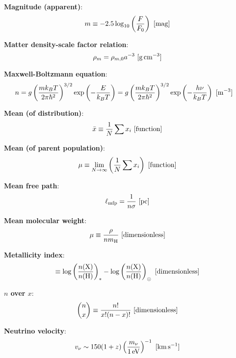 \documentclass[a4paper,10pt]{article}
\begin{document}
{\noindent}\textbf{Magnitude (apparent)}:
\begin{align*}
    m \equiv -2.5\log_{10}\left(\frac{F}{F_0}\right) ~ [{\rm mag}]
\end{align*}

{\noindent}\textbf{Matter density-scale factor relation}:
\begin{align*}
    \rho_m = \rho_{m,0}a^{-3} ~ [{\rm g\,cm^{-3}}]
\end{align*}

{\noindent}\textbf{Maxwell-Boltzmann equation}:
\begin{align*}
    n &= g\left(\frac{mk_BT}{2\pi\hbar^2}\right)^{3/2}\exp\left(-\frac{E}{k_BT}\right) = g\left(\frac{mk_BT}{2\pi\hbar^2}\right)^{3/2}\exp\left(-\frac{h\nu}{k_BT}\right) ~ [{\rm m^{-3}}]
\end{align*}

{\noindent}\textbf{Mean (of distribution)}:
\begin{align*}
    \bar{x} \equiv \frac{1}{N} \sum x_i ~ [{\rm function}]
\end{align*}

{\noindent}\textbf{Mean (of parent population)}:
\begin{align*}
    \mu \equiv \lim_{N\rightarrow\infty}\left( \frac{1}{N} \sum x_i \right) ~ [{\rm function}]
\end{align*}

{\noindent}\textbf{Mean free path}:
\begin{align*}
    \ell_\mathrm{mfp} = \dfrac{1}{n\sigma} ~ [{\rm pc}]
\end{align*}

{\noindent}\textbf{Mean molecular weight}:
\begin{align*}
    \mu \equiv \frac{\rho}{nm_{\rm H}} ~ [{\rm dimensionless}]
\end{align*}

{\noindent}\textbf{Metallicity index}:
\begin{align*}
    [\mathrm{X}/\mathrm{H}] \equiv \log\left(\frac{n(\mathrm{X})}{n(\mathrm{H})}\right)_* -\log\left(\frac{n(\mathrm{X})}{n(\mathrm{H})}\right)_\odot ~ [{\rm dimensionless}]
\end{align*}

{\noindent}\textbf{$n$ over $x$}:
\begin{align*}
    \binom{n}{x} \equiv \frac{n!}{x!(n-x)!} ~ [{\rm dimensionless}]
\end{align*}

{\noindent}\textbf{Neutrino velocity}:
\begin{align*}
    v_\nu \sim 150(1+z)\left(\frac{m_\nu}{1\,{\rm eV}}\right)^{-1} ~ [{\rm km\,s^{-1}}]
\end{align*}
\end{document}
